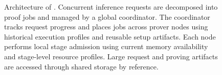 \begin{figure}[t]

\caption{
Architecture of \TITLE{}. Concurrent inference requests are decomposed
into proof jobs and managed by a global coordinator. The coordinator
tracks request progress and places jobs across prover nodes using
historical execution profiles and reusable setup artifacts. Each node
performs local stage admission using current memory availability and
stage-level resource profiles. Large request and proving artifacts are
accessed through shared storage by reference.
}
\label{fig:architecture}
\end{figure}